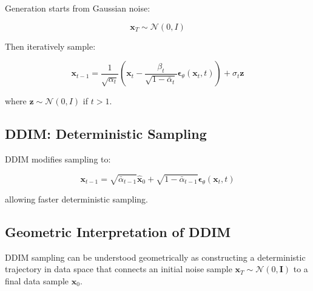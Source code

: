 Generation starts from Gaussian noise:

\begin{equation}
\mathbf{x}_T \sim \mathcal{N}(0, I)
\end{equation}

Then iteratively sample:

\begin{equation}
\mathbf{x}_{t-1}
=
\frac{1}{\sqrt{\alpha_t}}
\left(
\mathbf{x}_t
-
\frac{\beta_t}{\sqrt{1 - \bar{\alpha}_t}}
\boldsymbol{\epsilon}_\theta(\mathbf{x}_t, t)
\right)
+
\sigma_t \mathbf{z}
\end{equation}

where $\mathbf{z} \sim \mathcal{N}(0,I)$ if $t > 1$.





\subsection{DDIM: Deterministic Sampling}

DDIM modifies sampling to:

\begin{equation}
\mathbf{x}_{t-1}
=
\sqrt{\bar{\alpha}_{t-1}}
\hat{\mathbf{x}}_0
+
\sqrt{1 - \bar{\alpha}_{t-1}}
\boldsymbol{\epsilon}_\theta(\mathbf{x}_t, t)
\end{equation}

allowing faster deterministic sampling.

\subsection{Geometric Interpretation of DDIM}

DDIM sampling can be understood geometrically as constructing a deterministic trajectory in data space that connects an initial noise sample $\mathbf{x}_T \sim \mathcal{N}(0, \mathbf{I})$ to a final data sample $\mathbf{x}_0$.

